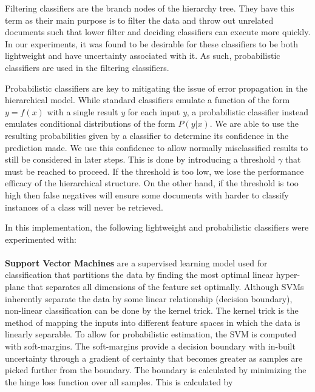 Filtering classifiers are the branch nodes of the hierarchy tree. They have this term as their main purpose is to filter the data and throw out unrelated documents such that lower filter and deciding classifiers can execute more quickly. In our experiments, it was found to be desirable for these classifiers to be both lightweight and have uncertainty associated with it. As such, probabilistic classifiers are used in the filtering classifiers. 

Probabilistic classifiers are key to mitigating the issue of error propagation in the hierarchical model. While standard classifiers emulate a function of the form $y=f(x)$ with a single result \textit{y} for each input \textit{y}, a probabilistic classifier instead emulates conditional distributions of the form $P(y|x)$. We are able to use the resulting probabilities given by a classifier to determine its confidence in the prediction made. We use this confidence to allow normally misclassified results to still be considered in later steps. This is done by introducing a threshold $\gamma$ that must be reached to proceed. If the threshold is too low, we lose the performance efficacy of the hierarchical structure. On the other hand, if the threshold is too high then false negatives will ensure some documents with harder to classify instances of a class will never be retrieved.

In this implementation, the following lightweight and probabilistic classifiers were experimented with:
\\
\\
\textbf{Support Vector Machines} are a supervised learning model used for classification that partitions the data by finding the most optimal linear hyper-plane that separates all dimensions of the feature set optimally. Although SVMs inherently separate the data by some linear relationship (decision boundary), non-linear classification can be done by the kernel trick. The kernel trick is the method of mapping the inputs into different feature spaces in which the data is linearly separable. To allow for probabilistic estimation, the SVM is computed with soft-margins. The soft-margins provide a decision boundary with in-built uncertainty through a gradient of certainty that becomes greater as samples are picked further from the boundary. The boundary is calculated by minimizing the the hinge loss function over all samples. This is calculated by

